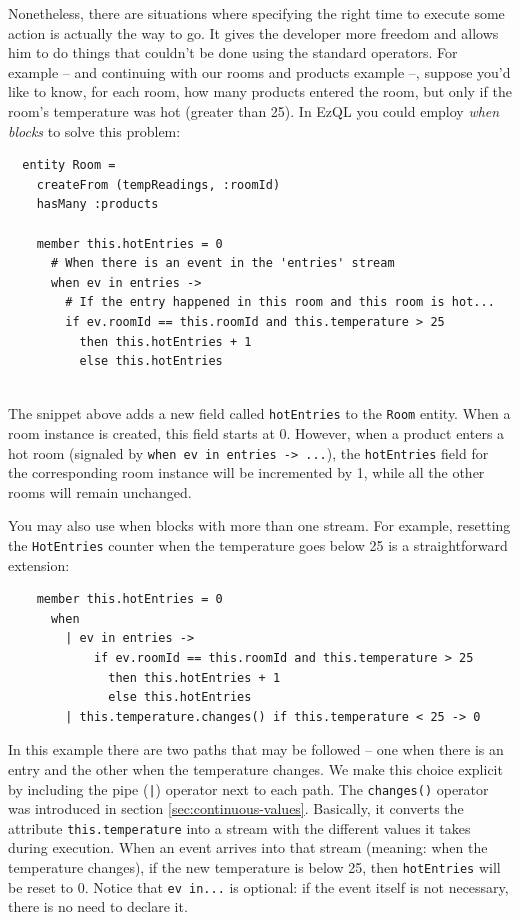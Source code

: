 Nonetheless, there are situations where specifying the right time to
execute some action is actually the way to go. It gives the developer
more freedom and allows him to do things that couldn't be done using
the standard operators. For example -- and continuing with our rooms
and products example --, suppose you'd like to know, for each room,
how many products entered the room, but only if the room's temperature
was hot (greater than 25). In EzQL you could employ \emph{when blocks}
to solve this problem:

\begin{lstlisting}
  entity Room =
    createFrom (tempReadings, :roomId)
    hasMany :products

    member this.hotEntries = 0
      # When there is an event in the 'entries' stream
      when ev in entries ->
        # If the entry happened in this room and this room is hot...
        if ev.roomId == this.roomId and this.temperature > 25
          then this.hotEntries + 1
          else this.hotEntries


\end{lstlisting}

The snippet above adds a new field called \verb=hotEntries= to the
\verb=Room= entity. When a room instance is created, this field starts
at 0. However, when a product enters a hot room (signaled by
\verb=when ev in entries -> ...=), the \verb=hotEntries= field for the
corresponding room instance will be incremented by 1, while all the
other rooms will remain unchanged.

You may also use when blocks with more than one stream. For example,
resetting the \verb=HotEntries= counter when the temperature goes below
25 is a straightforward extension:

\begin{lstlisting}
    member this.hotEntries = 0
      when
        | ev in entries ->
            if ev.roomId == this.roomId and this.temperature > 25
              then this.hotEntries + 1
              else this.hotEntries
        | this.temperature.changes() if this.temperature < 25 -> 0
\end{lstlisting}

In this example there are two paths that may be followed -- one when
there is an entry and the other when the temperature changes. We make
this choice explicit by including the pipe (\verb=|=) operator next to
each path. The \verb=changes()= operator was introduced in section
\ref{sec:continuous-values}. Basically, it converts the attribute
\verb=this.temperature= into a stream with the different values it
takes during execution. When an event arrives into that stream
(meaning: when the temperature changes), if the new temperature is
below 25, then \verb=hotEntries= will be reset to 0. Notice that
\verb=ev in...= is optional: if the event itself is not necessary,
there is no need to declare it.

